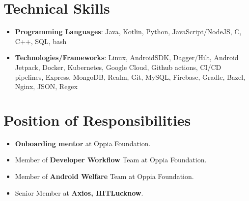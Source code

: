 \documentclass[letterpaper,11pt]{article}
\newcommand{\resumeSubHeadingListStart}{\begin{itemize}[leftmargin=*]}
\newcommand{\resumeSubHeadingListEnd}{\end{itemize}}
\begin{document}
%
\section{Technical Skills}
\resumeSubHeadingListStart
\item{
            \textbf{Programming Languages}{: Java, Kotlin, Python, JavaScript/NodeJS, C, C++, SQL, bash}
      }
\item{
            \textbf{Technologies/Frameworks}{: Linux, AndroidSDK, Dagger/Hilt, Android Jetpack, Docker, Kubernetes, Google Cloud, Github actions, CI/CD pipelines, Express, MongoDB, Realm, Git, MySQL, Firebase, Gradle, Bazel, Nginx, JSON, Regex}
      }
\resumeSubHeadingListEnd

\section{Position of Responsibilities}
\begin{itemize}
  \item \textbf{Onboarding mentor} at Oppia Foundation.
  \item Member of \textbf{Developer Workflow} Team at Oppia Foundation.
  \item Member of \textbf{Android Welfare} Team at Oppia Foundation.
  \item Senior Member at \textbf{Axios, IIITLucknow}.
\end{itemize}
\end{document}
